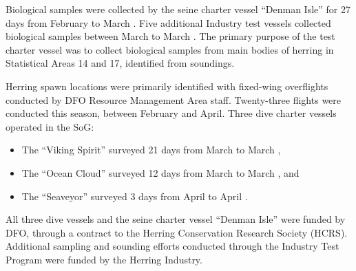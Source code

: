 Biological samples were collected by the seine charter vessel ``Denman Isle'' for 27 days from February  to March .
Five additional Industry test vessels collected biological samples between March  to March .
The primary purpose of the test charter vessel was to collect biological samples from main bodies of herring in Statistical Areas 14 and 17, identified from soundings.

Herring spawn locations were primarily identified with fixed-wing overflights conducted by DFO Resource Management Area staff.
Twenty-three flights were conducted this season, between February and April.
Three dive charter vessels operated in the SoG:
\begin{itemize}
\item The ``Viking Spirit'' surveyed 21 days from March  to March ,
\item The ``Ocean Cloud'' surveyed 12 days from March  to March , and
\item The ``Seaveyor'' surveyed 3 days from April  to April .
\end{itemize}
All three dive vessels and the seine charter vessel ``Denman Isle'' were funded by DFO, through a contract to the Herring Conservation Research Society (HCRS).
Additional sampling and sounding efforts conducted through the Industry Test Program were funded by the Herring Industry.

